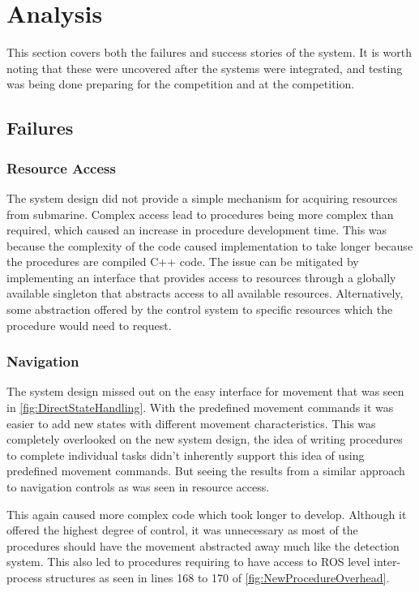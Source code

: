 \chapter{Analysis}

\label{Chapter4}

This section covers both the failures and success stories of the system. It is worth noting that these were uncovered after the systems were integrated, and testing was being done preparing for the competition and at the competition.

\section{Failures}

\subsection{Resource Access}
The system design did not provide a simple mechanism for acquiring resources
from submarine.
Complex access lead to procedures being more complex than required, which caused
an increase in procedure development time.
This was because the complexity of the code caused implementation to take longer
because the procedures are compiled C++ code.
The issue can be mitigated by implementing an interface that provides access to
resources through a globally available singleton that abstracts access to all
available resources.
Alternatively, some abstraction offered by the control system to specific
resources which the procedure would need to request.

\subsection{Navigation}
The system design missed out on the easy interface for movement that was seen in
\ref{fig:DirectStateHandling}.
With the predefined movement commands it was easier to add new states with
different movement characteristics.
This was completely overlooked on the new system design, the idea of writing
procedures to complete individual tasks didn't inherently support this idea of
using predefined movement commands.
But seeing the results from a similar approach to navigation controls as was
seen in resource access.

This again caused more complex code which took longer to develop.
Although it offered the highest degree of control, it was unnecessary as most of
the procedures should have the movement abstracted away much like the detection
system.
This also led to procedures requiring to have access to ROS level inter-process
structures as seen in lines 168 to 170 of \ref{fig:NewProcedureOverhead}.

